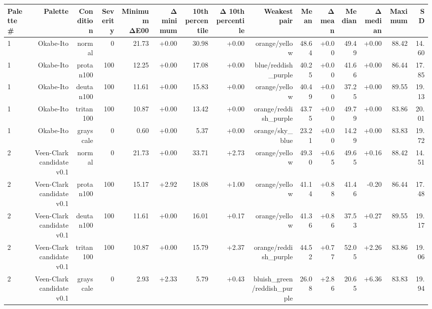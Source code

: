 \begin{tabular}{lrrrrrrrrrrrrrr}
\toprule
Palette \# & Palette & Condition & Severity & Minimum ΔE00 & Δ minimum & 10th percentile & Δ 10th percentile & Weakest pair & Mean & Δ mean & Median & Δ median & Maximum & SD \\
\midrule
1 & Okabe-Ito & normal & 0 & 21.73 & +0.00 & 30.98 & +0.00 & orange/yellow & 48.64 & +0.00 & 49.49 & +0.00 & 88.42 & 14.60 \\
1 & Okabe-Ito & protan100 & 100 & 12.25 & +0.00 & 17.08 & +0.00 & blue/reddish\_purple & 40.25 & +0.00 & 41.66 & +0.00 & 86.44 & 17.85 \\
1 & Okabe-Ito & deutan100 & 100 & 11.61 & +0.00 & 15.83 & +0.00 & orange/yellow & 40.49 & +0.00 & 37.25 & +0.00 & 89.55 & 19.13 \\
1 & Okabe-Ito & tritan100 & 100 & 10.87 & +0.00 & 13.42 & +0.00 & orange/reddish\_purple & 43.75 & +0.00 & 49.79 & +0.00 & 83.86 & 20.01 \\
1 & Okabe-Ito & grayscale & 0 & 0.60 & +0.00 & 5.37 & +0.00 & orange/sky\_blue & 23.21 & +0.00 & 14.29 & +0.00 & 83.83 & 19.72 \\
2 & Veen-Clark candidate v0.1 & normal & 0 & 21.73 & +0.00 & 33.71 & +2.73 & orange/yellow & 49.30 & +0.65 & 49.65 & +0.16 & 88.42 & 14.51 \\
2 & Veen-Clark candidate v0.1 & protan100 & 100 & 15.17 & +2.92 & 18.08 & +1.00 & orange/yellow & 41.14 & +0.88 & 41.46 & -0.20 & 86.44 & 17.48 \\
2 & Veen-Clark candidate v0.1 & deutan100 & 100 & 11.61 & +0.00 & 16.01 & +0.17 & orange/yellow & 41.36 & +0.86 & 37.53 & +0.27 & 89.55 & 19.17 \\
2 & Veen-Clark candidate v0.1 & tritan100 & 100 & 10.87 & +0.00 & 15.79 & +2.37 & orange/reddish\_purple & 44.52 & +0.77 & 52.05 & +2.26 & 83.86 & 19.06 \\
2 & Veen-Clark candidate v0.1 & grayscale & 0 & 2.93 & +2.33 & 5.79 & +0.43 & bluish\_green/reddish\_purple & 26.08 & +2.86 & 20.65 & +6.36 & 83.83 & 19.94 \\
\bottomrule
\end{tabular}
